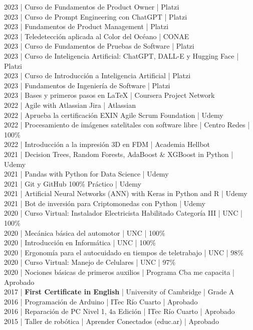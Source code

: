 {2023 | Curso de Fundamentos de Product Owner | Platzi \\
2023 | Curso de Prompt Engineering con ChatGPT | Platzi \\
2023 | Fundamentos de Product Management | Platzi \\
2023 | Teledetección aplicada al Color del Océano | CONAE \\
2023 | Curso de Fundamentos de Pruebas de Software | Platzi \\
2023 | Curso de Inteligencia Artificial: ChatGPT, DALL-E y Hugging Face | Platzi \\
2023 | Curso de Introducción a Inteligencia Artificial | Platzi \\
2023 | Fundamentos de Ingeniería de Software | Platzi \\
2023 | Bases y primeros pasos en LaTeX | Coursera Project Network \\
2022 | Agile with Atlassian Jira | Atlassian \\
2022 | Aprueba la certificación EXIN Agile Scrum Foundation | Udemy \\
2022 | Procesamiento de imágenes satelitales con software libre | Centro Redes | 100\% \\
2022 | Introducción a la impresión 3D en FDM | Academia Hellbot \\
2021 | Decision Trees, Random Forests, AdaBoost \& XGBoost in Python | Udemy \\
2021 | Pandas with Python for Data Science | Udemy \\
2021 | Git y GitHub 100\% Práctico | Udemy \\
2021 | Artificial Neural Networks (ANN) with Keras in Python and R | Udemy \\
2021 | Bot de inversión para Criptomonedas con Python | Udemy \\
2020 | Curso Virtual: Instalador Electricista Habilitado Categoría III | UNC | 100\% \\
2020 | Mecánica básica del automotor | UNC | 100\% \\
2020 | Introducción en Informática | UNC | 100\% \\
2020 | Ergonomía para el autocuidado en tiempos de teletrabajo | UNC | 98\% \\
2020 | Curso Virtual: Manejo de Celulares | UNC | 97\% \\
2020 | Nociones básicas de primeros auxilios | Programa Cba me capacita | Aprobado \\
2017 | \textbf{First Certificate in English} | University of Cambridge | Grade A \\
2016 | Programación de Arduino | ITec Río Cuarto | Aprobado \\
2016 | Reparación de PC Nivel 1, 4a Edición | ITec Río Cuarto | Aprobado \\
2015 | Taller de robótica | Aprender Conectados (educ.ar) | Aprobado \\
}

